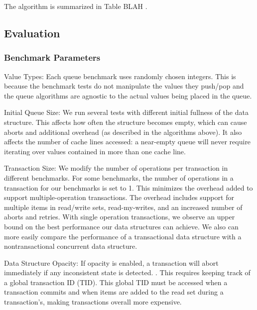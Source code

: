 The algorithm is summarized in Table BLAH .
 
\subsection{Evaluation}

\subsubsection{Benchmark Parameters}
\begin{bullets}
\item Value Types: Each queue benchmark uses randomly chosen integers. This is because the benchmark tests do not manipulate the values they push/pop and the queue algorithms are agnostic to the actual values being placed in the queue.

\item Initial Queue Size: We run several tests with different initial fullness of the data structure. This affects how often the structure becomes empty, which can cause aborts and additional overhead (as described in the algorithms above). It also affects the number of cache lines accessed: a near-empty queue will never require iterating over values contained in more than one cache line.

\item Transaction Size: We modify the number of operations per transaction in different benchmarks. For some benchmarks, the number of operations in a transaction for our benchmarks is set to 1. This minimizes the overhead added to support multiple-operation transactions. The overhead includes support for multiple items in read/write sets, read-my-writes, and an increased number of aborts and retries. With single operation transactions, we observe an upper bound on the best performance our data structures can achieve. We also can more easily compare the performance of a transactional data structure with a nontransactional concurrent data structure.

\item Data Structure Opacity: If opacity is enabled, a transaction will abort immediately if any inconsistent state is detected. . This requires keeping track of a global transaction ID (TID). This global TID must be accessed when a transaction commits and when items are added to the read set during a transaction's, making transactions overall more expensive.
\end{bullets}

